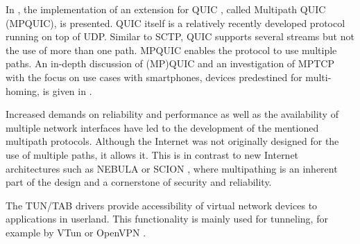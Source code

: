In \cite{MPQUICPaper}, the implementation of an extension for QUIC \cite{quic-transport-29, QUICChromium}, called Multipath QUIC (MPQUIC), is presented. QUIC itself is a relatively recently developed protocol running on top of UDP. Similar to SCTP, QUIC supports several streams but not the use of more than one path. MPQUIC enables the protocol to use multiple paths. An in-depth discussion of (MP)QUIC and an investigation of MPTCP with the focus on use cases with smartphones, devices predestined for multi-homing, is given in \cite{MPQUICThesis}.

Increased demands on reliability and performance as well as the availability of multiple network interfaces have led to the development of the mentioned multipath protocols.  Although the Internet was not originally designed for the use of multiple paths, it allows it.  This is in contrast to new Internet architectures such as NEBULA \cite{NEBULA} or SCION \cite{SCIONPaper, SCIONBook}, where multipathing is an inherent part of the design and a cornerstone of security and reliability. 

The TUN/TAB drivers \cite{TUNTAPDriver} provide accessibility of virtual network devices to applications in userland. This functionality is mainly used for tunneling, for example by VTun \cite{VTun} or OpenVPN \cite{OpenVPN}.
